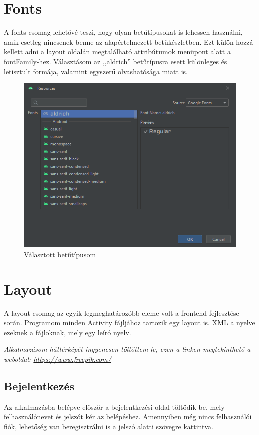 \documentclass{thesis-ekf}
\begin{document}
\section{Fonts}
A fonts csomag lehetővé teszi, hogy olyan betűtípusokat is lehessen használni, amik esetleg nincsenek benne az alapértelmezett betűkészletben. Ezt külön hozzá kellett adni a layout oldalán megtalálható attribútumok menüpont alatt a fontFamily-hez. Választásom az ,,aldrich'' betűtípusra esett különleges és letisztult formája, valamint egyszerű olvashatósága miatt is.
\begin{figure}[tbh]
	\centering
	\includegraphics[width=1.0\linewidth]{betutipus}
	\caption{Választott betűtípusom}
	\label{betutipus}
\end{figure}

\section{Layout}
A layout csomag az egyik legmeghatározóbb eleme volt a frontend fejlesztése során. Programom minden Activity fájljához tartozik egy layout is. XML a nyelve ezeknek a fájloknak, mely egy leíró nyelv.

\textit{Alkalmazásom háttérképét ingyenesen töltöttem le, ezen a linken megtekinthető a weboldal: \url{https://www.freepik.com/}}

\subsection{Bejelentkezés}
Az alkalmazásba belépve először a bejelentkezési oldal töltődik be, mely felhasználónevet és jelszót kér az belépéshez. Amennyiben még nincs felhasználói fiók, lehetőség van beregisztrálni is a jelszó alatti szövegre kattintva.
\end{document}
